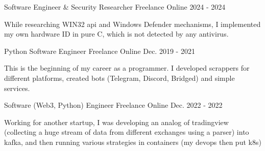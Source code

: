 


\begin{cventries}


\cventry
{Software Engineer \& Security Researcher } %
{Freelance} %
{Online} %
{2024 - 2024} %
{ %
\begin{cvitems}
\item { While researching WIN32 api and Windows Defender mechanisms, I implemented my own hardware ID in pure C, which is not detected by any antivirus.  }
\end{cvitems}
}




\cventry
{Python Software Engineer} %
{Freelance} %
{Online} %
{Dec. 2019 - 2021} %
{ %
\begin{cvitems}
\item { This is the beginning of my career as a programmer. I developed scrappers for different platforms, created bots (Telegram, Discord, Bridged) and simple services. }
\end{cvitems}
}


\cventry
{Software (Web3, Python) Engineer} %
{Freelance} %
{Online} %
{Dec. 2022 - 2022} %
{ %
\begin{cvitems}
\item { Working for another startup, I was developing an analog of tradingview (collecting a huge stream of data from different exchanges using a parser) into kafka, and then running various strategies in containers (my devops then put k8s)  } 
\end{cvitems}
}


\end{cventries}
